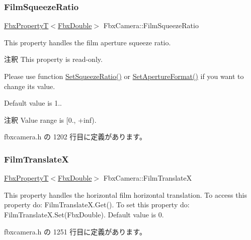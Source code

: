 \mbox{\label{class_fbx_camera_a21d8a100a10638aafdbf69304c651c48}} 
\subsubsection{\texorpdfstring{Film\+Squeeze\+Ratio}{FilmSqueezeRatio}}
{\footnotesize\ttfamily \hyperlink{class_fbx_property_t}{Fbx\+PropertyT}$<$\hyperlink{fbxtypes_8h_a171e72a1c46fc15c1a6c9c31948c1c5b}{Fbx\+Double}$>$ Fbx\+Camera\+::\+Film\+Squeeze\+Ratio}

This property handles the film aperture squeeze ratio.

\begin{DoxyRemark}{注釈}
This property is read-\/only. 

Please use function \hyperlink{class_fbx_camera_a4ef18832cc863f5dcc086d0d10686122}{Set\+Squeeze\+Ratio()} or \hyperlink{class_fbx_camera_a5b644b41e4d72c214acfdb5a2dee7576}{Set\+Aperture\+Format()} if you want to change its value.
\end{DoxyRemark}
Default value is 1.. \begin{DoxyRemark}{注釈}
Value range is \mbox{[}0., +inf). 
\end{DoxyRemark}


 fbxcamera.\+h の 1202 行目に定義があります。

\mbox{\label{class_fbx_camera_af0c221000e5299efd1e91408bb4d96b6}} 
\subsubsection{\texorpdfstring{Film\+TranslateX}{FilmTranslateX}}
{\footnotesize\ttfamily \hyperlink{class_fbx_property_t}{Fbx\+PropertyT}$<$\hyperlink{fbxtypes_8h_a171e72a1c46fc15c1a6c9c31948c1c5b}{Fbx\+Double}$>$ Fbx\+Camera\+::\+Film\+TranslateX}

This property handles the horizontal film horizontal translation. To access this property do\+: Film\+Translate\+X.\+Get(). To set this property do\+: Film\+Translate\+X.\+Set(\+Fbx\+Double). Default value is 0. 

 fbxcamera.\+h の 1251 行目に定義があります。


